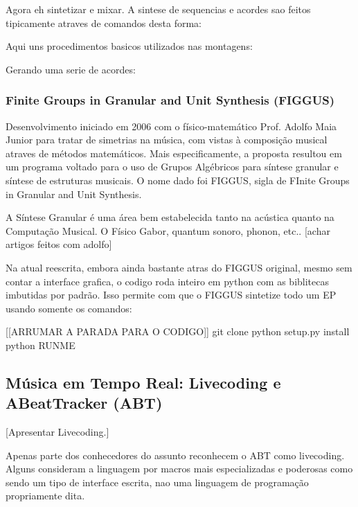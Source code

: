 
Agora eh sintetizar e mixar. A sintese de sequencias e acordes sao feitos tipicamente
atraves de comandos desta forma:


Aqui uns procedimentos basicos utilizados nas montagens:


Gerando uma serie de acordes:






\subsubsection{Finite Groups in Granular and Unit Synthesis (FIGGUS)}

Desenvolvimento iniciado em 2006 com o físico-matemático Prof. Adolfo Maia Junior para
tratar de simetrias na música, com vistas à composição musical atraves
de métodos matemáticos. Mais especificamente, a proposta resultou em
um programa voltado para o uso de Grupos Algébricos para síntese
granular e síntese de estruturas musicais. O nome dado
foi FIGGUS, sigla de FInite Groups in Granular and Unit Synthesis.

A Síntese Granular é uma área bem estabelecida tanto na acústica quanto
na Computação Musical. O Físico Gabor, quantum sonoro, phonon, etc..
[achar artigos feitos com adolfo]

Na atual reescrita, embora ainda bastante atras do FIGGUS original,
mesmo sem contar a interface grafica, o codigo roda inteiro em python
com as biblitecas imbutidas por padrão. Isso permite com que o FIGGUS
sintetize todo um EP usando somente os comandos:

[[ARRUMAR A PARADA PARA O CODIGO]]
git clone
python setup.py install
python RUNME


  \subsection{Música em Tempo Real: Livecoding e ABeatTracker (ABT)}

  [Apresentar Livecoding.]

  Apenas parte dos conhecedores do assunto reconhecem
  o ABT como livecoding. Alguns
  consideram a linguagem por macros mais especializadas e poderosas como
  sendo um tipo de interface escrita, nao uma linguagem de programação
  propriamente dita.

